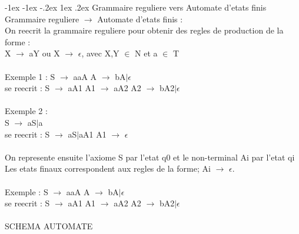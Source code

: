 \documentclass[5pt]{article}
\makeatletter
\renewcommand{\subsubsection}{\@startsection {section}{1}{\z@}%
             {-1ex \@plus -1ex \@minus -.2ex}%
             {1ex \@plus.2ex}%
             {\normalfont\scriptsize\sffamily\bfseries}}
\makeatother
\begin{document}
\begin{scriptsize}
\subsubsection{Grammaire reguliere vers Automate d'etats finis }
Grammaire reguliere $\rightarrow$ Automate d’etats finis :\\
On reecrit la grammaire reguliere pour obtenir des regles de production de la forme :\\
X $\rightarrow$ aY ou X $\rightarrow$ $\epsilon$, avec X,Y $\in$ N et a $\in$ T\\
\\
Exemple 1 : S $\rightarrow$ aaA A $\rightarrow$ bA$\mid\epsilon$\\
se reecrit : S $\rightarrow$ aA1 A1 $\rightarrow$ aA2 A2 $\rightarrow$ bA2$\mid\epsilon$\\
\\
Exemple 2 :\\
S $\rightarrow$ aS$\mid$a\\
se reecrit : S $\rightarrow$ aS$\mid$aA1 A1 $\rightarrow$ $\epsilon$\\
\\
On represente ensuite l’axiome S par l’etat q0 et le non-terminal Ai par l’etat qi\\
Les etats finaux correspondent aux regles de la forme; Ai $\rightarrow$ $\epsilon$.\\
\\
Exemple : S $\rightarrow$ aaA A $\rightarrow$ bA$\mid\epsilon$\\
se reecrit : S $\rightarrow$ aA1 A1 $\rightarrow$ aA2 A2 $\rightarrow$ bA2$\mid\epsilon$\\
\\
SCHEMA AUTOMATE\\
\\

\end{scriptsize}
\end{document}
